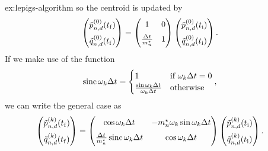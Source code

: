 \begin{DefAnswer}{ex:lepigs-algorithm}
	so the centroid is updated by
	\begin{align}
		\begin{pmatrix}
			\tilde{p}_{n,d}^{(0)}(t_\mathrm{f}) \\[2 mm]
			\tilde{q}_{n,d}^{(0)}(t_\mathrm{f})
		\end{pmatrix}
		&= \begin{pmatrix}
				1 & 0 \\[2 mm]
				\frac{\Delta t}{{m}^\star_n} & 1
			\end{pmatrix}
			\begin{pmatrix}
				\tilde{p}_{n,d}^{(0)}(t_\mathrm{i}) \\[2 mm]
				\tilde{q}_{n,d}^{(0)}(t_\mathrm{i})
			\end{pmatrix}.
	\end{align}
	If we make use of the function
	\begin{align}
		\operatorname{sinc}{\omega_k \Delta t}
		&= \begin{cases}
				1 & \text{if } \omega_k \Delta t = 0 \\
				\frac{\sin{\omega_k \Delta t}}{\omega_k \Delta t} & \text{otherwise}
			\end{cases},
	\end{align}
	we can write the general case as
	\begin{align}
		\begin{pmatrix}
			\tilde{p}_{n,d}^{(k)}(t_\mathrm{f}) \\[2 mm]
			\tilde{q}_{n,d}^{(k)}(t_\mathrm{f})
		\end{pmatrix}
		&= \begin{pmatrix}
				\cos{\omega_k \Delta t} & -{m}^\star_n \omega_k \sin{\omega_k \Delta t} \\[2 mm]
				\frac{\Delta t}{{m}^\star_n} \operatorname{sinc}{\omega_k \Delta t} & \cos{\omega_k \Delta t}
			\end{pmatrix}
			\begin{pmatrix}
				\tilde{p}_{n,d}^{(k)}(t_\mathrm{i}) \\[2 mm]
				\tilde{q}_{n,d}^{(k)}(t_\mathrm{i})
			\end{pmatrix}.
	\end{align}


\end{DefAnswer}
